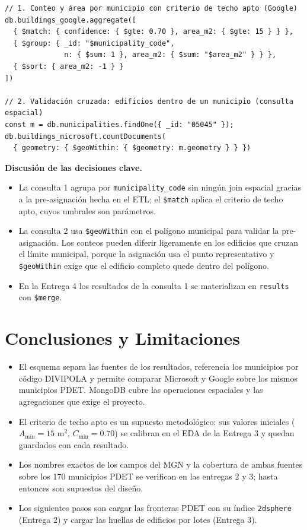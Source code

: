 \documentclass[11pt,letterpaper]{article}
\newenvironment{codebox}{\par\noindent\begin{minipage}{\linewidth}}{\end{minipage}\par}
\begin{document}
\begin{codebox}\begin{lstlisting}[style=lab,language=mongosh]
// 1. Conteo y área por municipio con criterio de techo apto (Google)
db.buildings_google.aggregate([
  { $match: { confidence: { $gte: 0.70 }, area_m2: { $gte: 15 } } },
  { $group: { _id: "$municipality_code",
              n: { $sum: 1 }, area_m2: { $sum: "$area_m2" } } },
  { $sort: { area_m2: -1 } }
])

// 2. Validación cruzada: edificios dentro de un municipio (consulta espacial)
const m = db.municipalities.findOne({ _id: "05045" });
db.buildings_microsoft.countDocuments(
  { geometry: { $geoWithin: { $geometry: m.geometry } } })
\end{lstlisting}\end{codebox}

\noindent\textbf{Discusión de las decisiones clave.}
\begin{itemize}
  \item La consulta 1 agrupa por \texttt{municipality\_code} sin ningún join espacial gracias a la
  pre-asignación hecha en el ETL; el \texttt{\$match} aplica el criterio de techo apto, cuyos
  umbrales son parámetros.
  \item La consulta 2 usa \texttt{\$geoWithin} con el polígono municipal para validar la
  pre-asignación. Los conteos pueden diferir ligeramente en los edificios que cruzan el límite
  municipal, porque la asignación usa el punto representativo y \texttt{\$geoWithin} exige que el
  edificio completo quede dentro del polígono.
  \item En la Entrega 4 los resultados de la consulta 1 se materializan en \texttt{results} con
  \texttt{\$merge}.
\end{itemize}

\section{Conclusiones y Limitaciones}

\begin{itemize}
  \item El esquema separa las fuentes de los resultados, referencia los municipios por código
  DIVIPOLA y permite comparar Microsoft y Google sobre los mismos municipios PDET. MongoDB cubre las
  operaciones espaciales y las agregaciones que exige el proyecto.
  \item El criterio de techo apto es un supuesto metodológico: sus valores iniciales
  ($A_{\min}=15$ m$^2$, $C_{\min}=0.70$) se calibran en el EDA de la Entrega 3 y quedan guardados
  con cada resultado.
  \item Los nombres exactos de los campos del MGN y la cobertura de ambas fuentes sobre los 170
  municipios PDET se verifican en las entregas 2 y 3; hasta entonces son supuestos del diseño.
  \item Los siguientes pasos son cargar las fronteras PDET con su índice \texttt{2dsphere}
  (Entrega 2) y cargar las huellas de edificios por lotes (Entrega 3).
\end{itemize}
\end{document}
